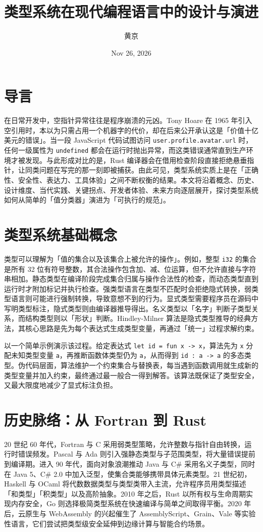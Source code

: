 \title{类型系统在现代编程语言中的设计与演进}
\author{黄京}
\date{Nov 26, 2026}
\maketitle
\chapter{导言}
在日常开发中，空指针异常往往是程序崩溃的元凶。Tony Hoare 在 1965 年引入空引用时，本以为只需占用一个机器字的代价，却在后来公开承认这是「价值十亿美元的错误」。当一段 JavaScript 代码试图访问 \texttt{user.profile.avatar.url} 时，任何一级属性为 \texttt{undefined} 都会在运行时抛出异常，而这类错误通常直到生产环境才被发现。与此形成对比的是，Rust 编译器会在借用检查阶段直接拒绝悬垂指针，让同类问题在写完的那一刻即被捕获。由此可见，类型系统实质上是在「正确性、安全性、表达力、工具体验」之间不断权衡的结果。本文将沿着概念、历史、设计维度、当代实践、关键拐点、开发者体验、未来方向逐层展开，探讨类型系统如何从简单的「值分类器」演进为「可执行的规范」。\par
\chapter{类型系统基础概念}
类型可以理解为「值的集合以及该集合上被允许的操作」。例如，整型 \texttt{i32} 的集合是所有 32 位有符号整数，其合法操作包含加、减、位运算，但不允许直接与字符串相加。静态类型在编译阶段完成集合归属与操作合法性的检查，而动态类型直到运行时才附加标记并执行检查。强类型语言在类型不匹配时会拒绝隐式转换，弱类型语言则可能进行强制转换，导致意想不到的行为。显式类型需要程序员在源码中写明类型标注，隐式类型则由编译器推导得出。名义类型以「名字」判断子类型关系，而结构类型则以「形状」判断。Hindley-Milner 算法是隐式类型推导的经典方法，其核心思路是先为每个表达式生成类型变量，再通过「统一」过程求解约束。\par
以一个简单示例演示该过程。给定表达式 \texttt{let id = fun x -> x}，算法先为 \texttt{x} 分配未知类型变量 \texttt{a}，再推断函数体类型仍为 \texttt{a}，从而得到 \texttt{id : a -> a} 的多态类型。伪代码层面，算法维护一个约束集合与替换表，每当遇到函数调用就生成新的类型变量并加入约束，最终通过最一般合一得到解答。该算法既保证了类型安全，又最大限度地减少了显式标注负担。\par
\chapter{历史脉络：从 Fortran 到 Rust}
20 世纪 60 年代，Fortran 与 C 采用弱类型策略，允许整数与指针自由转换，运行时错误频发。Pascal 与 Ada 则引入强静态类型与子范围类型，将大量错误提前到编译期。进入 90 年代，面向对象浪潮推动 Java 与 C\#{} 采用名义子类型，同时在 Java 5、C\#{} 2.0 中加入泛型，使集合类能够携带具体元素类型。21 世纪初，Haskell 与 OCaml 将代数数据类型与类型类带入主流，允许程序员用类型描述「和类型」「积类型」以及高阶抽象。2010 年之后，Rust 以所有权与生命周期实现内存安全，Go 则选择极简类型系统在快速编译与简单之间取得平衡。2020 年后，云原生与 WebAssembly 的兴起催生了 AssemblyScript、Grain、Vale 等实验性语言，它们尝试把类型级安全延伸到边缘计算与智能合约场景。\par
